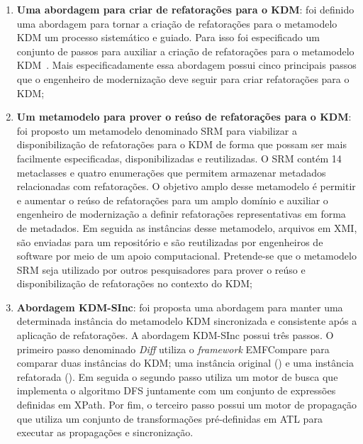 \begin{enumerate}

\item \textbf{Uma abordagem para criar de refatorações para o KDM}: foi definido uma abordagem para tornar a criação de refatorações para o metamodelo KDM um processo sistemático e guiado. Para isso foi especificado um conjunto de passos para auxiliar a criação de refatorações para o metamodelo KDM~\cite{durelli_catalogo}. Mais especificadamente essa abordagem possui cinco principais passos que o engenheiro de modernização deve seguir para criar refatorações para o KDM;

\item \textbf{Um metamodelo para prover o reúso de refatorações para o KDM}: foi proposto um metamodelo denominado SRM para viabilizar a disponibilização de refatorações para o KDM de forma que possam ser mais facilmente especificadas, disponibilizadas e reutilizadas. O SRM contém 14 metaclasses e quatro enumerações que permitem armazenar metadados relacionadas com refatorações. O objetivo amplo desse metamodelo é permitir e aumentar o reúso de refatorações para um amplo domínio e auxiliar o engenheiro de modernização a definir refatorações representativas em forma de metadados. Em seguida as instâncias desse metamodelo, arquivos em XMI, são enviadas para um repositório e são reutilizadas por engenheiros de software por meio de um apoio computacional. Pretende-se que o metamodelo SRM seja utilizado por outros pesquisadores para prover o reúso e disponibilização de refatorações no contexto do KDM;

\item \textbf{Abordagem KDM-SInc}: foi proposta uma abordagem para manter uma determinada instância do metamodelo KDM sincronizada e consistente após a aplicação de refatorações. A abordagem KDM-SInc possui três passos. O primeiro passo denominado \textit{Diff} utiliza o \textit{framework} EMFCompare  para comparar duas instâncias do KDM; uma instância original () e uma instância refatorada (). Em seguida o segundo passo utiliza um motor de busca que implementa o algoritmo DFS juntamente com um conjunto de expressões definidas em XPath. Por fim, o terceiro passo possui um motor de propagação que utiliza um conjunto de transformações pré-definidas em ATL para executar as propagações e sincronização.


\end{enumerate}

